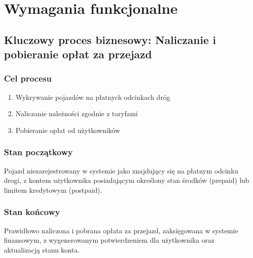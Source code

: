 \section{Wymagania funkcjonalne}

\subsection{Kluczowy proces biznesowy: Naliczanie i pobieranie opłat za przejazd}

\subsubsection{Cel procesu}
\begin{enumerate}
    \item Wykrywanie pojazdów na płatnych odcinkach dróg
    \item Naliczanie należności zgodnie z taryfami
    \item Pobieranie opłat od użytkowników
\end{enumerate}

\subsubsection{Stan początkowy}
Pojazd niezarejestrowany w systemie jako znajdujący się na płatnym odcinku drogi, z kontem użytkownika posiadającym określony stan środków (prepaid) lub limitem kredytowym (postpaid).

\subsubsection{Stan końcowy}
Prawidłowo naliczona i pobrana opłata za przejazd, zaksięgowana w systemie finansowym, z wygenerowanym potwierdzeniem dla użytkownika oraz aktualizacją stanu konta.

